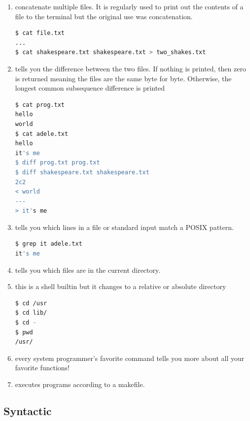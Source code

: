 \begin{enumerate}
\item {} concatenate multiple files. It is regularly used to print out the contents of a file to the terminal but the original use was concatenation.

\begin{lstlisting}[language=bash]
$ cat file.txt
...
$ cat shakespeare.txt shakespeare.txt > two_shakes.txt
\end{lstlisting}

\item {} tells you the difference between the two files. If nothing is printed, then zero is returned meaning the files are the same byte for byte. Otherwise, the longest common subsequence difference is printed

\begin{lstlisting}[language=bash]
$ cat prog.txt
hello
world
$ cat adele.txt
hello
it's me
$ diff prog.txt prog.txt
$ diff shakespeare.txt shakespeare.txt
2c2
< world
---
> it's me
\end{lstlisting}

\item {} tells you which lines in a file or standard input match a POSIX pattern.

\begin{lstlisting}[language=bash]
$ grep it adele.txt
it's me
\end{lstlisting}

\item {} tells you which files are in the current directory.
\item {} this is a shell builtin but it changes to a relative or absolute directory

\begin{lstlisting}[language=bash]
$ cd /usr
$ cd lib/
$ cd -
$ pwd
/usr/
\end{lstlisting}

\item {} every system programmer's favorite command tells you more about all your favorite functions!
\item {} executes programs according to a makefile.

\end{enumerate}

\subsection{Syntactic}


